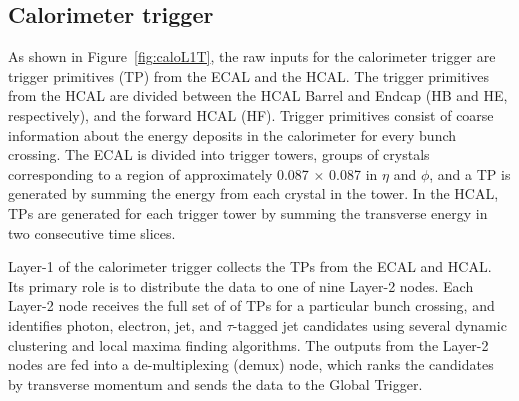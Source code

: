 
\subsection{Calorimeter trigger}
As shown in Figure~\ref{fig:caloL1T}, the raw inputs for the calorimeter trigger are trigger primitives (TP) from the ECAL and the HCAL. The trigger primitives from the HCAL are divided between the HCAL Barrel and Endcap (HB and HE, respectively), and the forward HCAL (HF). Trigger primitives consist of coarse information about the energy deposits  in the calorimeter for every bunch crossing. The ECAL is divided into trigger towers, groups of crystals corresponding to a region of approximately 0.087 $\times$ 0.087 in $\eta$ and $\phi$, and a TP is generated by summing the energy from each crystal in the tower. In the HCAL, TPs are generated for each trigger tower by summing the transverse energy in two consecutive time slices. 

Layer-1 of the calorimeter trigger collects the TPs from the ECAL and HCAL. Its primary role is to distribute the data to one of nine Layer-2 nodes. Each Layer-2 node receives the full set of of TPs for a particular bunch crossing, and identifies photon, electron, jet, and $\tau$-tagged jet candidates using several dynamic clustering and local maxima finding algorithms. The outputs from the Layer-2 nodes are fed into a de-multiplexing (demux) node, which ranks the candidates by transverse momentum and sends the data to the Global Trigger. 


